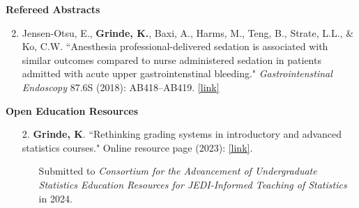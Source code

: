 \documentclass[margin]{res}
\newenvironment{benumerate}[1]{
    \let\oldItem\item
    \def\item{\addtocounter{enumi}{-2}\oldItem}
    
    \begin{enumerate}
    \setcounter{enumi}{#1}
    \addtocounter{enumi}{1}
}{
    \end{enumerate}
}
\begin{document}
\begin{resume}
\textbf{Refereed Abstracts}
\begin{benumerate}{1}
\item Jensen-Otsu, E., \textbf{Grinde, K.}, Baxi, A., Harms, M., Teng, B., Strate, L.L., \& Ko, C.W. 
``Anesthesia professional-delivered sedation is associated with similar outcomes compared to nurse administered sedation in patients admitted with acute upper gastrointenstinal bleeding." \textit{Gastrointenstinal Endoscopy} 87.6S (2018):  AB418--AB419. %
\href{https://www.giejournal.org/article/S0016-5107(18)32182-5/fulltext}{[link]}

\end{benumerate}



\textbf{Open Education Resources}

\begin{itemize}


\item[2.] \textbf{Grinde, K}.  ``Rethinking grading systems in introductory and advanced statistics courses." Online resource page (2023): \href{https://docs.google.com/document/d/e/2PACX-1vRY7IXAvGEoXgH2eRM7YSoo5c7sQr3-_jdGLdndp2thBMqL8WaJvEvdZS6uazbjhKVfLoZiNZmuJNgH/pub}{[link]}. 
\begin{itemize}
\item[] \begin{footnotesize}
Submitted to \textit{Consortium for the Advancement of Undergraduate Statistics Education Resources for JEDI-Informed Teaching of Statistics} in 2024.  
\end{footnotesize}
\end{itemize}


\end{itemize}
\end{resume}
\end{document}
